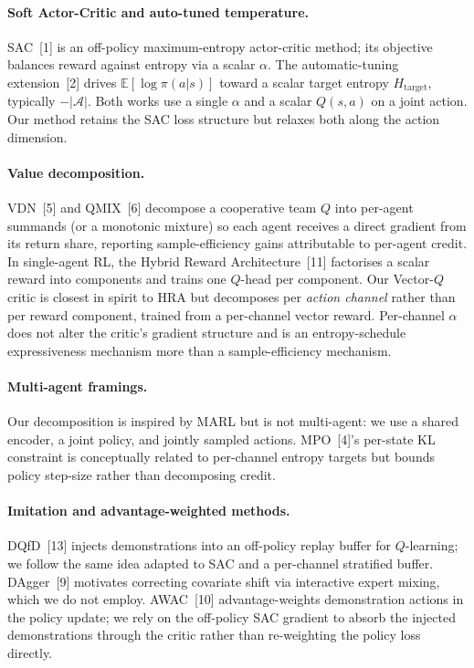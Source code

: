 \documentclass{article}
\begin{document}
\paragraph{Soft Actor-Critic and auto-tuned temperature.}
SAC~[1] is an off-policy maximum-entropy actor-critic method; its
objective balances reward against entropy via a scalar $\alpha$. The
automatic-tuning extension~[2] drives $\mathbb{E}[\log\pi(a|s)]$
toward a scalar target entropy $H_\text{target}$, typically
$-|\mathcal A|$. Both works use a single $\alpha$ and a scalar
$Q(s,a)$ on a joint action. Our method retains the SAC loss structure
but relaxes both along the action dimension.

\paragraph{Value decomposition.}
VDN~[5] and QMIX~[6] decompose a cooperative team $Q$ into per-agent
summands (or a monotonic mixture) so each agent receives a direct
gradient from its return share, reporting sample-efficiency gains
attributable to per-agent credit. In single-agent RL, the Hybrid
Reward Architecture~[11] factorises a scalar reward into components
and trains one $Q$-head per component. Our Vector-$Q$ critic is
closest in spirit to HRA but decomposes per \emph{action channel}
rather than per reward component, trained from a per-channel vector
reward. Per-channel $\alpha$ does not alter the critic's gradient
structure and is an entropy-schedule expressiveness mechanism
more than a sample-efficiency mechanism.

\paragraph{Multi-agent framings.}
Our decomposition is inspired by MARL but is not multi-agent: we use
a shared encoder, a joint policy, and jointly sampled actions.
MPO~[4]'s per-state KL constraint is conceptually related to
per-channel entropy targets but bounds policy step-size rather than
decomposing credit.

\paragraph{Imitation and advantage-weighted methods.}
DQfD~[13] injects demonstrations into an off-policy replay buffer for
$Q$-learning; we follow the same idea adapted to SAC and a
per-channel stratified buffer. DAgger~[9] motivates correcting
covariate shift via interactive expert mixing, which we do not
employ. AWAC~[10] advantage-weights demonstration actions in the
policy update; we rely on the off-policy SAC gradient to absorb the
injected demonstrations through the critic rather than re-weighting
the policy loss directly.
\end{document}
